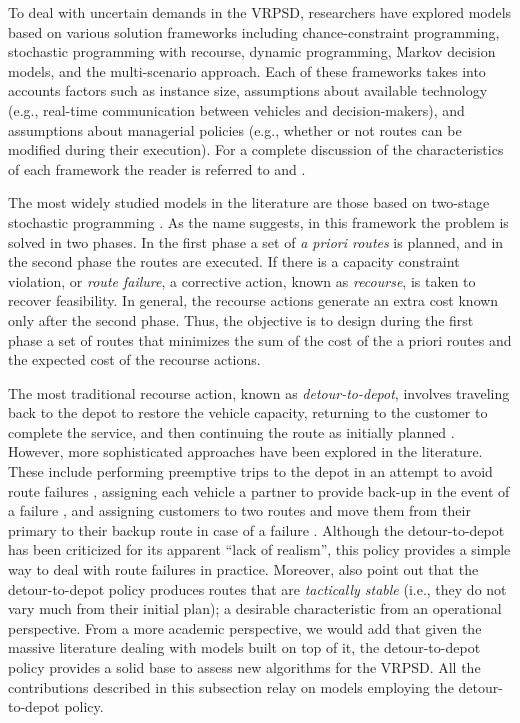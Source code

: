 To deal with uncertain demands in the VRPSD, researchers have explored models based on various solution frameworks including
chance-constraint programming, stochastic programming with recourse, dynamic programming, Markov decision models, and the multi-scenario approach. Each of these frameworks takes into accounts factors such as instance size, assumptions about available technology (e.g., real-time communication between vehicles and decision-makers), and assumptions about managerial policies (e.g., whether or not routes can be modified during their execution). For a complete discussion of the characteristics of each framework the reader is referred to \cite{Secomandi2009} and \cite{Pillac2013}.

The most widely studied models in the literature are those based on two-stage stochastic programming \citep{Cordeau2006}. As the name suggests, in this framework the problem is solved in two phases. In the first phase a set of \emph{a priori routes} is planned, and in the second phase the routes are executed. If there is a capacity constraint violation, or \emph{route failure}, a corrective action, known as \emph{recourse}, is taken to recover feasibility. In general, the recourse actions generate an extra cost known only after the second phase. Thus, the objective is to design during the first phase a set of routes that minimizes the sum of the cost of the a priori routes and the expected cost of the recourse actions.

The most traditional recourse action, known as \emph{detour-to-depot}, involves traveling back to the depot to restore the vehicle capacity, returning to the customer to complete the service, and then continuing the route as initially planned \citep{Savelsbergh1995}. However, more sophisticated approaches have been explored in the literature. These include performing preemptive trips to the depot in an attempt to avoid route failures \citep{Yang2000,Bianchi2004,Tatarakis2009,Pandelis2012}, assigning each vehicle a partner to provide back-up in the event of a failure \citep{Ak2007}, and assigning customers to two routes and move them from their primary to their backup route in case of a failure \citep{Erera2009}. Although the detour-to-depot has been criticized for its apparent ``lack of realism'', this policy provides a simple way to deal with route failures in practice. Moreover, \cite{Gendreau2016} also point out that the detour-to-depot policy produces routes that are \emph{tactically stable} (i.e., they do not vary much from their initial plan); a desirable characteristic from an operational perspective. From a more academic perspective, we would add that given the massive literature dealing with models built on top of it, the detour-to-depot policy provides a solid base to assess new algorithms for the VRPSD. All the contributions described in this subsection relay on models employing the detour-to-depot policy. 

